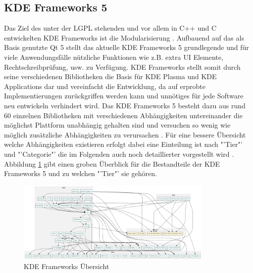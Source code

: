\documentclass[10pt,a4paper,twocolumn]{article}
\begin{document}
\subsection{KDE Frameworks 5}
Das Ziel des unter der LGPL stehenden und vor allem in C++ und C entwickelten KDE Frameworks ist die Modularisierung \cite{KDEDeveloperPlatform}. Aufbauend auf das als Basis genutzte Qt 5 stellt das aktuelle KDE Frameworks 5 grundlegende und für viele Anwendungsfälle nützliche Funktionen wie z.B. extra UI Elemente, Rechtschreibprüfung, usw. zu Verfügung. KDE Frameworks stellt somit durch seine verschiedenen Bibliotheken die Basis für KDE Plasma und KDE Applications dar und vereinfacht die Entwicklung, da auf erprobte Implementierungen zurückgriffen werden kann und unnötiges für jede Software neu entwickeln verhindert wird. Das KDE Frameworks 5 besteht dazu aus rund 60 einzelnen Bibliotheken mit verschiedenen Abhängigkeiten untereinander die möglichst Plattform unabhängig gehalten sind und versuchen so wenig wie möglich zusätzliche Abhängigkeiten zu verursachen \cite{KDEFramework5TechPreview}. Für eine bessere Übersicht welche Abhängigkeiten existieren erfolgt dabei eine Einteilung ist nach "'Tier"' und "'Categorie"' die im Folgenden auch noch detaillierter vorgestellt wird \cite{KDEFramework5}. Abbildung \ref{fig:kde_frameworks} gibt einen groben Überblick für die Bestandteile der KDE Frameworks 5 und zu welchen "'Tier"' sie gehören.

\begin{figure}[tb]
	\centering
	\includegraphics[width=0.85\textwidth]{images/kf5_big_0.png}
	\caption{KDE Frameworks Übersicht \cite{KDEFramework5TechPreview}}
	\label{fig:kde_frameworks}
\end{figure}
\end{document}
